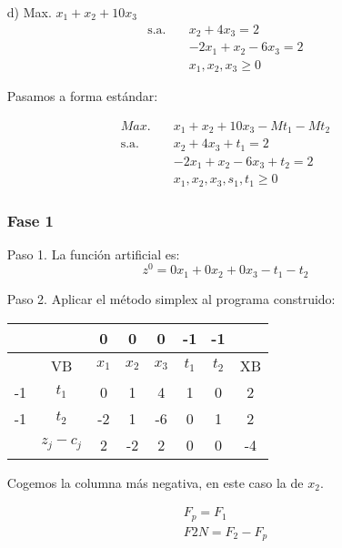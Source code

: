 \begin{itemize}
    
    \item[d)] Max. $x_1 + x_2 + 10x_3$
    \begin{align*}
        \text{s.a.} \quad & x_2 + 4x_3 = 2 \\
        & -2x_1 + x_2 - 6x_3 = 2 \\
        & x_1, x_2, x_3 \geq 0
    \end{align*}

    Pasamos a forma estándar:

    \begin{align*}
        Max. \quad & x_1 + x_2 + 10x_3 - Mt_1 -Mt_2\\
        \text{s.a.} \quad & x_2 + 4x_3 + t_1= 2 \\
        & -2x_1 + x_2 - 6x_3 + t_2 = 2 \\
        & x_1, x_2, x_3, s_1, t_1 \geq 0
    \end{align*}

    \subsubsection*{Fase 1}

    Paso 1. La función artificial es: 
    \begin{equation*}
        z^0=0x_1 + 0x_2 + 0x_3  -t_1 -t_2
    \end{equation*}

    Paso 2. Aplicar el método simplex al programa construido:

    \begin{table}[H]
        \centering
        \begin{tabular}{|c|c|c|c|c|c|c|c|}
        \hline
        &  & 0 & 0 & 0 & -1 & -1 &\\
        \hline
        & VB & $x_1$ & $x_2$ & $x_3$ & $t_1$ & $t_2$ & XB \\
        \hline
        -1 & $t_1$ & 0 & 1 & 4 & 1 & 0 & 2\\
        \hline
        -1 & $t_2$ & -2 & 1 & -6 & 0& 1 &2\\
        \hline
        & $z_j - c_j$ & 2 & -2& 2 & 0 & 0 &-4\\
        \hline
        \end{tabular}
    \end{table}

    Cogemos la columna más negativa, en este caso la de $x_2$.

    \begin{align*}
        F_p = F_1\\
        F2N = F_2 - F_p
    \end{align*}


\end{itemize}
